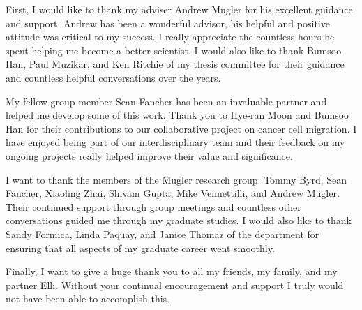 \begin{acknowledgments}
  First, I would like to thank my adviser Andrew Mugler for his excellent guidance and support.
  Andrew has been a wonderful advisor, his helpful and positive attitude was critical to my success. I really appreciate the countless hours he spent helping me become a better scientist.
  I would also like to thank Bumsoo Han, Paul Muzikar, and Ken Ritchie of my thesis committee for their guidance and countless helpful conversations over the years.

  My fellow group member Sean Fancher has been an invaluable partner and helped me develop some of this work. Thank you to Hye-ran Moon and Bumsoo Han for their contributions to our collaborative project on cancer cell migration. I have enjoyed being part of our interdisciplinary team and their feedback on my ongoing projects really helped improve their value and significance.

  I want to thank the members of the Mugler research group: Tommy Byrd, Sean Fancher, Xiaoling Zhai, Shivam Gupta, Mike Vennettilli, and Andrew Mugler. Their continued support through group meetings and countless other conversations guided me through my graduate studies.
  I would also like to thank Sandy Formica, Linda Paquay, and Janice Thomaz of the department for ensuring that all aspects of my graduate career went smoothly.

  Finally, I want to give a huge thank you to all my friends, my family, and my partner Elli. Without your continual encouragement and support I truly would not have been able to accomplish this.
\end{acknowledgments}


\tableofcontents

